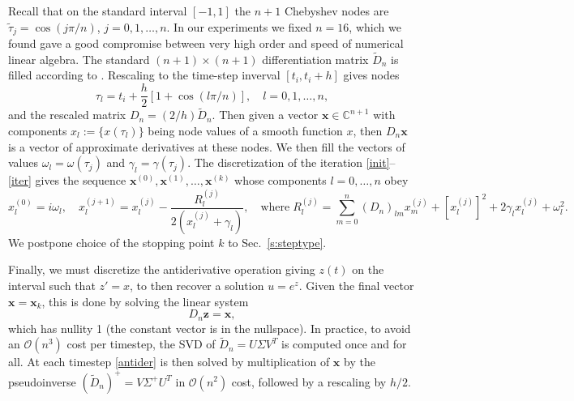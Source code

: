 \documentclass[10pt]{article}
\newcommand{\be}{\begin{equation}}
\newcommand{\ee}{\end{equation}}
\newcommand{\mbf}[1]{{\mathbf #1}}
\newcommand{\C}{\mathbb{C}}
\newcommand{\bigO}{{\mathcal O}}
\newcommand{\om}{\omega}
\newcommand{\g}{\gamma}
\begin{document}
Recall that on the standard interval $[-1, 1]$ the $n+1$ Chebyshev nodes are
$\tilde\tau_j = \cos\left( j\pi/n\right)$, $j = 0, 1, \dots, n$.
In our experiments we fixed $n=16$, which we found gave a good compromise
between very high order and speed of numerical linear algebra.
The standard $(n+1) \times (n+1)$ differentiation matrix $\tilde{D}_n$
is filled according to \cite[Ch.~6]{tref}.
Rescaling to the time-step inverval $[t_i, t_i+h]$
gives nodes
\be\label{scaledt}
\tau_l = t_i + \frac{h}{2}[1+\cos (l\pi/n)], \quad l = 0, 1, \ldots, n,
\ee
and the rescaled matrix $D_n = (2/h) \tilde D_n$.
Then given a vector $\mbf{x}\in\C^{n+1}$ with components
$x_l := \{x(\tau_l)\}$ being node values of a smooth function $x$,
then $D_n\mbf{x}$ is a vector of approximate derivatives at these nodes.
We then fill the vectors of values $\om_l=\om(\tau_j)$
and $\g_l=\gamma(\tau_j)$.
The discretization of the iteration \eqref{init}--\eqref{iter}
gives the sequence $\mbf{x}^{(0)}, \mbf{x}^{(1)},\dots,\mbf{x}^{(k)}$ whose
components $l=0,\dots, n$ obey
$$
x^{(0)}_l = i\om_l,
\quad
x^{(j+1)}_l = x^{(j)}_l - \frac{R^{(j)}_l}{2(x^{(j)}_l + \g_l)},
\quad \mbox{where}\;
R^{(j)}_l = \sum_{m=0}^n (D_n)_{lm}x^{(j)}_m  + [x^{(j)}_l]^2 + 2\g_lx^{(j)}_l + \om_l^2
.
$$
We postpone choice of the stopping point $k$ to Sec.~\ref{s:steptype}.

Finally, we must discretize the antiderivative operation giving
$z(t)$ on the interval such that $z' = x$, to then recover a solution $u = e^z$.
Given the final vector $\mbf{x}=\mbf{x}_k$, this is done by solving
the linear system
\be
D_n \mbf{z} = \mbf{x},
\label{antider}
\ee
which has nullity 1 (the constant vector is in the nullspace).
In practice, to avoid an $\bigO(n^3)$ cost per timestep,
the SVD of $\tilde D_n = U \Sigma V^T$ is computed once and for all.
At each timestep \eqref{antider} is then solved
by multiplication of $\mbf{x}$
by the pseudoinverse $(\tilde D_n)^+ = V \Sigma^+ U^T$
in $\bigO(n^2)$ cost, followed by a rescaling by $h/2$.
\end{document}
